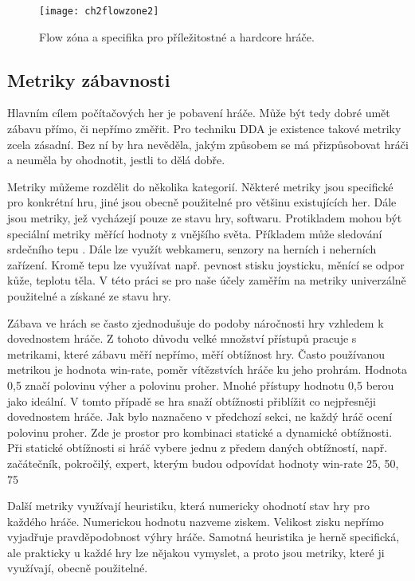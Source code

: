 \begin{figure}
  \centering
  \texttt{[image: ch2flowzone2]}
	\caption{Flow zóna a specifika pro příležitostné a hardcore hráče. \cite{thesisflow} }
	\label{fig:ch2flowzone2}
\end{figure}	

\subsection{Metriky zábavnosti} \label{sec:defzab}

Hlavním cílem počítačových her je pobavení hráče. Může být tedy dobré umět zábavu přímo, či nepřímo změřit. Pro techniku DDA je existence takové metriky zcela zásadní. Bez ní by hra nevěděla, jakým způsobem se má přizpůsobovat hráči a neuměla by ohodnotit, jestli to dělá dobře. 

Metriky můžeme rozdělit do několika kategorií. Některé metriky jsou specifické pro konkrétní hru, jiné jsou obecně použitelné pro většinu existujících her. Dále jsou metriky, jež vycházejí pouze ze stavu hry, softwaru. Protikladem mohou být speciální metriky měřící hodnoty z vnějšího světa. Příkladem může sledování srdečního tepu \cite{7}. Dále lze využít webkameru, senzory na herních i neherních zařízení. Kromě tepu lze využívat např. pevnost stisku joysticku, měnící se odpor kůže, teplotu těla.\cite{16Survey} V této práci se pro naše účely zaměřím na metriky univerzálně použitelné a získané ze stavu hry.

Zábava ve hrách se často zjednodušuje do podoby náročnosti hry vzhledem k dovednostem hráče. Z tohoto důvodu velké množství přístupů pracuje s metrikami, které zábavu měří nepřímo, měří obtížnost hry. Často používanou metrikou je hodnota win-rate, poměr vítězstvích hráče ku jeho prohrám. Hodnota 0,5 značí polovinu výher a polovinu proher. Mnohé přístupy hodnotu 0,5 berou jako ideální. V tomto případě se hra snaží obtížnosti přiblížit co nejpřesněji dovednostem hráče. Jak bylo naznačeno v předchozí sekci, ne každý hráč ocení polovinu proher. Zde je prostor pro kombinaci statické a dynamické obtížnosti. Při statické obtížnosti si hráč vybere jednu z předem daných obtížností, např. začátečník, pokročilý, expert, kterým budou odpovídat hodnoty win-rate 25, 50, 75 %

Další metriky využívají heuristiku, která numericky ohodnotí stav hry pro každého hráče. Numerickou hodnotu nazveme ziskem. Velikost zisku nepřímo vyjadřuje pravděpodobnost výhry hráče. Samotná heuristika je herně specifická, ale prakticky u každé hry lze nějakou vymyslet, a proto jsou metriky, které ji využívají, obecně použitelné. 

